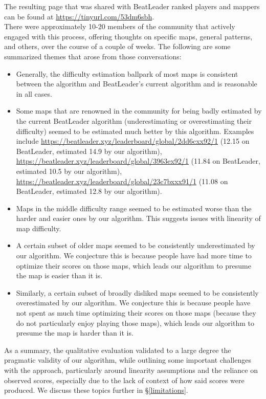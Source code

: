 \documentclass[12pt,a4paper]{article}
\begin{document}
The resulting page that was shared with BeatLeader ranked players and mappers can be found at \url{https://tinyurl.com/53dm6sbh}.\\

There were approximately 10-20 members of the community that actively engaged with this process, offering thoughts on specific maps, general patterns, and others, over the course of a couple of weeks. The following are some summarized themes that arose from those conversations:

\begin{itemize}

\item Generally, the difficulty estimation ballpark of most maps is consistent between the algorithm and BeatLeader's current algorithm and is reasonable in all cases.
\item Some maps that are renowned in the community for being badly estimated by the current BeatLeader algorithm (underestimating or overestimating their difficulty) seemed to be estimated much better by this algorithm. Examples include \url{https://beatleader.xyz/leaderboard/global/2dd6cxx92/1} (12.15 on BeatLeader, estimated 14.9 by our algorithm), \url{https://beatleader.xyz/leaderboard/global/3963ex92/1} (11.84 on BeatLeader, estimated 10.5 by our algorithm), \url{https://beatleader.xyz/leaderboard/global/23c7bxxx91/1}  (11.08 on BeatLeader, estimated 12.8 by our algorithm).
\item Maps in the middle difficulty range seemed to be estimated worse than the harder and easier ones by our algorithm. This suggests issues with linearity of map difficulty.
\item A certain subset of older maps seemed to be consistently underestimated by our algorithm. We conjecture this is because people have had more time to optimize their scores on those maps, which leads our algorithm to presume the map is easier than it is.
\item Similarly, a certain subset of broadly disliked maps seemed to be consistently overestimated by our algorithm. We conjecture this is because people have not spent as much time optimizing their scores on those maps (because they do not particularly enjoy playing those maps), which leads our algorithm to presume the map is harder than it is.

\end{itemize}

As a summary, the qualitative evaluation validated to a large degree the pragmatic validity of our algorithm, while outlining some important challenges with the approach, particularly around linearity assumptions and the reliance on observed scores, especially due to the lack of context of how said scores were produced. We discuss these topics further in \S \ref{limitations}.
\end{document}
